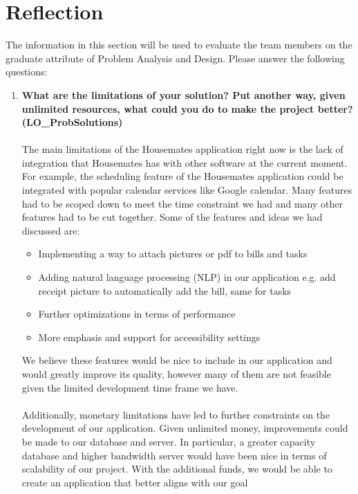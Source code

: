 \documentclass[12pt, titlepage]{article}
\begin{document}
\section{Reflection} \label{Reflection}

The information in this section will be used to evaluate the team members on the graduate attribute of Problem Analysis and Design.  Please answer the following questions:

\begin{enumerate}
  \item \textbf{What are the limitations of your solution?  Put another way, given unlimited resources, what could you do to make the project better? (LO\_ProbSolutions)}
  \\
  \\
  The main limitations of the Housemates application right now is the lack of integration that Housemates has with other software at the current moment. For example, the scheduling feature of the Housemates application could be integrated with popular calendar services like Google calendar. Many features had to be scoped down to meet the time constraint we had and many other features had to be cut together. Some of the features and ideas we had discussed are:
  \begin{itemize}
      \item Implementing a way to attach pictures or pdf to bills and tasks
      \item Adding natural language processing (NLP) in our application e.g. add receipt picture to automatically add the bill, same for tasks
      \item Further optimizations in terms of performance
      \item More emphasis and support for accessibility settings
  \end{itemize}
  We believe these features would be nice to include in our application and would greatly improve its quality, however many of them are not feasible given the limited development time frame we have.
  \\
  \\
  Additionally, monetary limitations have led to further constraints on the development of our application.
  Given unlimited money, improvements could be made to our database and server. In particular,
  a greater capacity database and higher bandwidth server would have been nice in terms of scalability of our
  project. With the additional funds, we would be able to create an application that better aligns with our goal

\end{enumerate}
\end{document}

